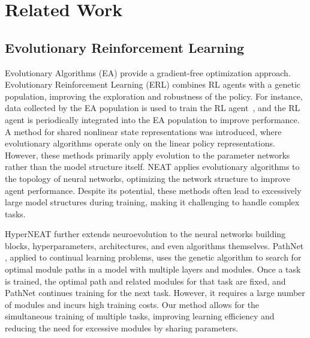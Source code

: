 \section{Related Work}
\subsection{Evolutionary Reinforcement Learning}
Evolutionary Algorithms (EA) \cite{Bäck_Schwefel_1993} provide a gradient-free optimization approach.
Evolutionary Reinforcement Learning (ERL) \cite{Pourchot_Sigaud_2018,Khadka_Majumdar_Nassar_Dwiel_Tumer_Miret_Liu_Tumer_2019,chen2019restart,Bodnar_Day_Lió_2020,Bodnar_Day_Lió_2020} combines RL agents with a genetic population, improving the exploration and robustness of the policy. 
For instance, data collected by the EA population is used to train the RL agent~\cite{Khadka_Tumer_2018}, and the RL agent is periodically integrated into the EA population to improve performance. 
A method for shared nonlinear state representations \cite{Li_Tang_Hao_Zheng_Fu_Meng_2022} was introduced, where evolutionary algorithms operate only on the linear policy representations.
However, these methods primarily apply evolution to the parameter networks rather than the model structure itself. 
NEAT \cite{Stanley_Miikkulainen_2002} applies evolutionary algorithms to the topology of neural networks, optimizing the network structure to improve agent performance.  
Despite its potential, these methods often lead to excessively large model structures during training, making it challenging to handle complex tasks. 

HyperNEAT \cite{Stanley_Clune_Lehman_Miikkulainen_2018} further extends neuroevolution to the neural networks building blocks, hyperparameters, architectures, and even algorithms themselves.
PathNet \cite{Fernando_Banarse_Blundell_Zwols_Ha_Rusu_Pritzel_Wierstra_2017}, applied to continual learning problems, uses the genetic algorithm to search for optimal module paths in a model with multiple layers and modules. Once a task is trained, the optimal path and related modules for that task are fixed, and PathNet continues training for the next task.
However, it requires a large number of modules and incurs high training costs. 
Our method allows for the simultaneous training of multiple tasks, improving learning efficiency and reducing the need for excessive modules by sharing parameters.

